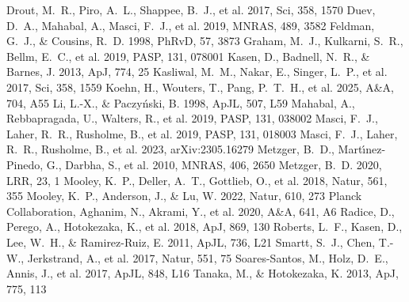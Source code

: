 \documentclass[twocolumn]{aastex631}
\begin{document}
\begin{thebibliography}{}
 Drout, M.~R., Piro, A.~L., Shappee, B.~J., et al. 2017, Sci, 358, 1570
 Duev, D.~A., Mahabal, A., Masci, F.~J., et al. 2019, MNRAS, 489, 3582
 Feldman, G.~J., \& Cousins, R.~D. 1998, PhRvD, 57, 3873
 Graham, M.~J., Kulkarni, S.~R., Bellm, E.~C., et al. 2019, PASP, 131, 078001
 Kasen, D., Badnell, N.~R., \& Barnes, J. 2013, ApJ, 774, 25
 Kasliwal, M.~M., Nakar, E., Singer, L.~P., et al. 2017, Sci, 358, 1559
 Koehn, H., Wouters, T., Pang, P.~T.~H., et al. 2025, A\&A, 704, A55
 Li, L.-X., \& Paczy{\'n}ski, B. 1998, ApJL, 507, L59
 Mahabal, A., Rebbapragada, U., Walters, R., et al. 2019, PASP, 131, 038002
 Masci, F.~J., Laher, R.~R., Rusholme, B., et al. 2019, PASP, 131, 018003
 Masci, F.~J., Laher, R.~R., Rusholme, B., et al. 2023, arXiv:2305.16279
 Metzger, B.~D., Mart{\'\i}nez-Pinedo, G., Darbha, S., et al. 2010, MNRAS, 406, 2650
 Metzger, B.~D. 2020, LRR, 23, 1
 Mooley, K.~P., Deller, A.~T., Gottlieb, O., et al. 2018, Natur, 561, 355
 Mooley, K.~P., Anderson, J., \& Lu, W. 2022, Natur, 610, 273
 Planck Collaboration, Aghanim, N., Akrami, Y., et al. 2020, A\&A, 641, A6
 Radice, D., Perego, A., Hotokezaka, K., et al. 2018, ApJ, 869, 130
 Roberts, L.~F., Kasen, D., Lee, W.~H., \& Ramirez-Ruiz, E. 2011, ApJL, 736, L21
 Smartt, S.~J., Chen, T.-W., Jerkstrand, A., et al. 2017, Natur, 551, 75
 Soares-Santos, M., Holz, D.~E., Annis, J., et al. 2017, ApJL, 848, L16
 Tanaka, M., \& Hotokezaka, K. 2013, ApJ, 775, 113
\end{thebibliography}
\end{document}

